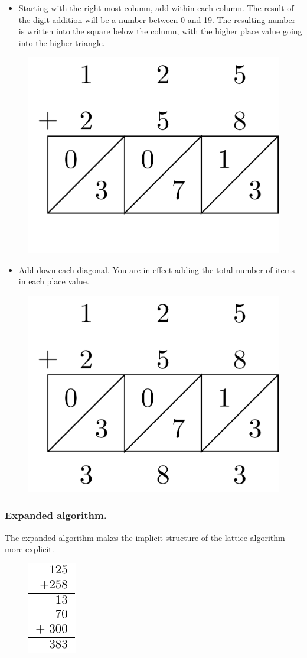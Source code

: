 \documentclass[
]{book}
\providecommand{\tightlist}{%
  \setlength{\itemsep}{0pt}\setlength{\parskip}{0pt}}
\theoremstyle{definition}
\theoremstyle{definition}
\theoremstyle{definition}
\theoremstyle{remark}
\begin{document}
\begin{itemize}
\tightlist
\item
  Starting with the right-most column, add within each column. The result of the digit addition will be a number between 0 and 19. The resulting number is written into the square below the column, with the higher place value going into the higher triangle.
\end{itemize}

\begin{figure}

{\centering \includegraphics[width=0.2\linewidth]{tikz/lattice-addition2} 

}

\end{figure}

\begin{itemize}
\tightlist
\item
  Add down each diagonal. You are in effect adding the total number of items in each place value.
\end{itemize}

\begin{figure}

{\centering \includegraphics[width=0.2\linewidth]{tikz/lattice-addition3} 

}

\end{figure}

\hypertarget{expanded-algorithm.}{%
\subsubsection*{Expanded algorithm.}\label{expanded-algorithm.}}

The expanded algorithm makes the implicit structure of the lattice algorithm more explicit.

\begin{figure}

{\centering \includegraphics[width=0.1\linewidth]{tikz/addition-model-algorithm-expanded} 

}

\end{figure}
\end{document}
